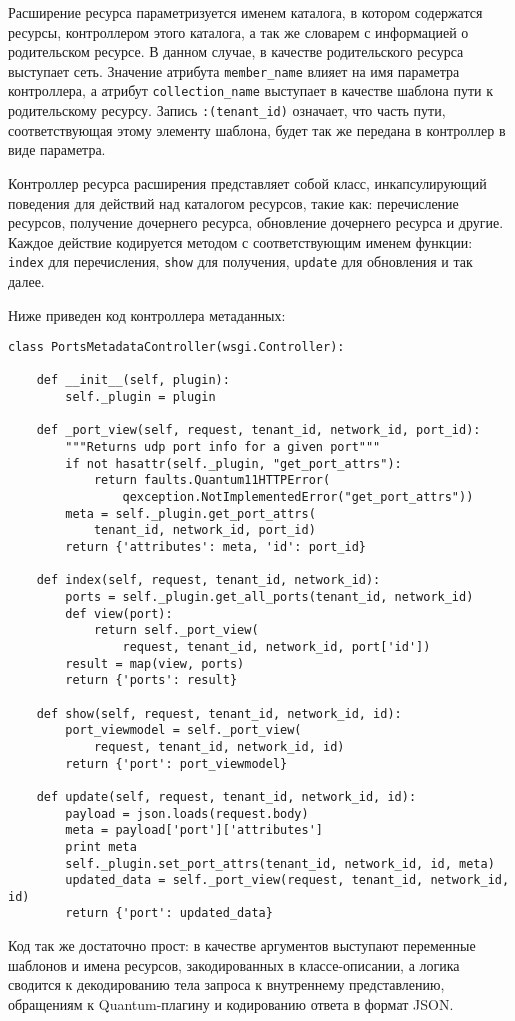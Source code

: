 Расширение ресурса параметризуется именем каталога, в котором содержатся ресурсы,
контроллером этого каталога, а так же словарем с информацией о родительском ресурсе.
В данном случае, в качестве родительского ресурса выступает сеть. Значение атрибута
\verb`member_name` влияет на имя параметра контроллера, а атрибут \verb`collection_name` 
выступает в качестве шаблона пути к родительскому ресурсу. Запись \verb`:(tenant_id)` означает,
что часть пути, соответствующая этому элементу шаблона, будет так же передана в контроллер
в виде параметра.

Контроллер ресурса расширения представляет собой класс, инкапсулирующий поведения для действий над каталогом ресурсов, такие как: перечисление ресурсов, получение дочернего
ресурса, обновление дочернего ресурса и другие. Каждое действие кодируется методом
с соответствующим именем функции: \verb`index` для перечисления, \verb`show` для получения,
\verb`update` для обновления и так далее.

Ниже приведен код контроллера метаданных:
\begin{lstlisting}
class PortsMetadataController(wsgi.Controller):

    def __init__(self, plugin):
        self._plugin = plugin

    def _port_view(self, request, tenant_id, network_id, port_id):
        """Returns udp port info for a given port"""
        if not hasattr(self._plugin, "get_port_attrs"):
            return faults.Quantum11HTTPError(
                qexception.NotImplementedError("get_port_attrs"))
        meta = self._plugin.get_port_attrs(
            tenant_id, network_id, port_id)
        return {'attributes': meta, 'id': port_id}

    def index(self, request, tenant_id, network_id):
        ports = self._plugin.get_all_ports(tenant_id, network_id)
        def view(port):
            return self._port_view(
                request, tenant_id, network_id, port['id'])
        result = map(view, ports)
        return {'ports': result}

    def show(self, request, tenant_id, network_id, id):
        port_viewmodel = self._port_view(
            request, tenant_id, network_id, id)
        return {'port': port_viewmodel}

    def update(self, request, tenant_id, network_id, id):
        payload = json.loads(request.body)
        meta = payload['port']['attributes']
        print meta
        self._plugin.set_port_attrs(tenant_id, network_id, id, meta)
        updated_data = self._port_view(request, tenant_id, network_id, id)
        return {'port': updated_data}
\end{lstlisting}
Код так же достаточно прост: в качестве аргументов выступают переменные шаблонов и 
имена ресурсов, закодированных в классе-описании, а логика сводится к декодированию
тела запроса к внутреннему представлению, обращениям к Quantum-плагину и кодированию
ответа в формат JSON.


